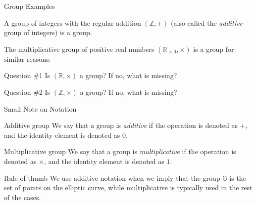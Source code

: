 \documentclass{beamer}
\begin{document}
    \begin{frame}{Group Examples}
      \begin{example}
        A group of integers with the regular addition $(\mathbb{Z},+)$ (also called the \textit{additive} group of integers) is a group.
      \end{example}
      
      \begin{example}
          The multiplicative group of positive real numbers $(\mathbb{R}_{> 0}, \times)$ is a group for similar reasons. 
      \end{example}
      
      \begin{alertblock}{Question \#1}
          Is $(\mathbb{R}, \times)$ a group? If no, what is missing?
      \end{alertblock}

      \begin{alertblock}{Question \#2}
        Is $(\mathbb{Z}, \times)$ a group? If no, what is missing?
      \end{alertblock}
    \end{frame}

    \begin{frame}{Small Note on Notation}
      \begin{block}{Additive group}
          We say that a group is \textit{additive} if the operation is denoted as $+$, and the identity element is denoted as $0$.
      \end{block}

      \begin{block}{Multiplicative group}
          We say that a group is \textit{multiplicative} if the operation is denoted as $\times$, and the identity element is denoted as $1$.
      \end{block}
      \begin{block}{Rule of thumb}
        We use additive notation when we imply that the group $\mathbb{G}$ is the set of points on the elliptic curve, while multiplicative is typically used in the rest of the cases.
      \end{block}
  \end{frame}
\end{document}
